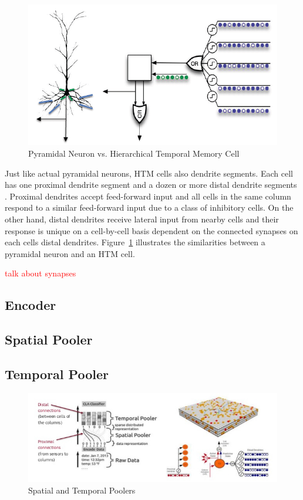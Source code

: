\documentclass[oneside,12pt,openany]{book}
\begin{document}
	\begin{figure}[h!]
		\centering
		\includegraphics[width=\linewidth]{images/HTMCell.jpg}
		\caption{Pyramidal Neuron vs. Hierarchical Temporal Memory Cell}
		\label{fig:HTMCell}
	\end{figure}

	Just like actual pyramidal neurons, HTM cells also dendrite segments. Each cell has one proximal dendrite segment and a dozen or more distal dendrite segments \cite {Whitepaper}. Proximal dendrites accept feed-forward input and all cells in the same column respond to a similar feed-forward input due to a class of inhibitory cells. On the other hand, distal dendrites receive lateral input from nearby cells and their response is unique on a cell-by-cell basis dependent on the connected synapses on each cells distal dendrites. Figure~\ref{fig:HTMCell} illustrates the similarities between a pyramidal neuron and an HTM cell.
	
	\textcolor{red}{talk about synapses}
	
	\subsection{Encoder}
	
	\subsection{Spatial Pooler}
	
	\subsection{Temporal Pooler}


	\begin{figure}[h!]
		\centering
		\includegraphics[width=\linewidth]{images/Poolers.jpg}
		\caption{Spatial and Temporal Poolers}
		\label{fig:Poolers}
	\end{figure}
\end{document}
